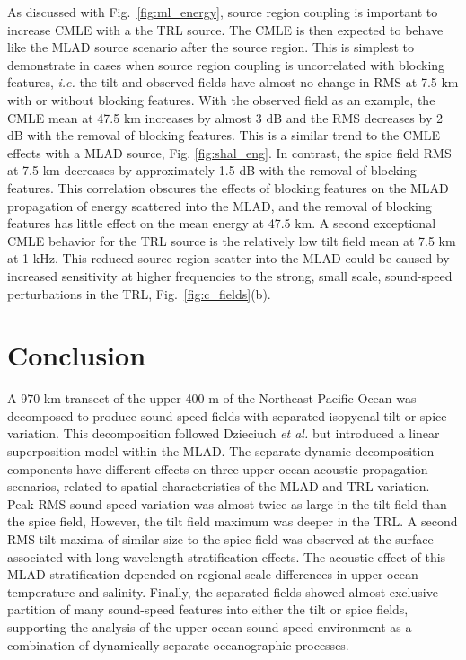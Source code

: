\documentclass[preprint,NumberedRefs]{JASA}
\begin{document}
As discussed with Fig.~\ref{fig:ml_energy}, source region coupling is important to increase CMLE with a the TRL source. The CMLE is then expected to behave like the MLAD source scenario after the source region. This is simplest to demonstrate in cases when source region coupling is uncorrelated with blocking features, \emph{i.e.} the tilt and observed fields have almost no change in RMS at 7.5 km with or without blocking features. With the observed field as an example, the CMLE mean at 47.5 km increases by almost 3 dB and the RMS decreases by 2 dB with the removal of blocking features. This is a similar trend to the CMLE effects with a MLAD source, Fig. \ref{fig:shal_eng}. In contrast, the spice field RMS at 7.5 km decreases by approximately 1.5 dB with the removal of blocking features. This correlation obscures the effects of blocking features on the MLAD propagation of energy scattered into the MLAD, and the removal of blocking features has little effect on the mean energy at 47.5 km. A second exceptional CMLE behavior for the TRL source is the relatively low tilt field mean at 7.5 km at 1 kHz. This reduced source region scatter into the MLAD could be caused by increased sensitivity at higher frequencies to the strong, small scale, sound-speed perturbations in the TRL, Fig.~\ref{fig:c_fields}(b).

\section{Conclusion}\label{sec:conclusion}
A 970 km transect of the upper 400 m of the Northeast Pacific Ocean was decomposed to produce sound-speed fields with separated isopycnal tilt or spice variation. This decomposition followed Dzieciuch \emph{et al.}\citep{dzieciuch2004} but introduced a linear superposition model within the MLAD. The separate dynamic decomposition components have different effects on three upper ocean acoustic propagation scenarios, related to spatial characteristics of the MLAD and TRL variation. Peak RMS sound-speed variation was almost twice as large in the tilt field than the spice field, However, the tilt field maximum was deeper in the TRL. A second RMS tilt maxima of similar size to the spice field was observed at the surface associated with long wavelength stratification effects. The acoustic effect of this MLAD stratification depended on regional scale differences in upper ocean temperature and salinity. Finally, the separated fields showed almost exclusive partition of many sound-speed features into either the tilt or spice fields, supporting the analysis of the upper ocean sound-speed environment as a combination of dynamically separate oceanographic processes.
\end{document}
